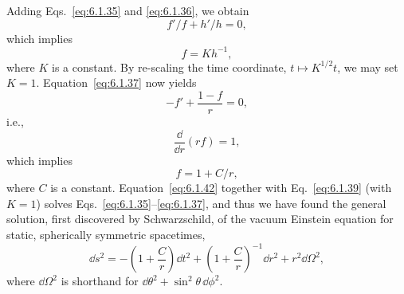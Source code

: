 Adding Eqs.~\eqref{eq:6.1.35} and \eqref{eq:6.1.36}, we obtain
\begin{equation}
  f'/f+h'/h=0,
  \tag{6.1.38}\label{eq:6.1.38}
\end{equation}
which implies
\begin{equation}
  f=Kh^{-1},
  \tag{6.1.39}\label{eq:6.1.39}
\end{equation}
where \(K\) is a constant. By re-scaling the time coordinate,
\(t\mapsto K^{1/2}t\), we may set \(K=1\). Equation~\eqref{eq:6.1.37} now yields
\begin{equation}
  -f'+\frac{1-f}{r}=0,
  \tag{6.1.40}\label{eq:6.1.40}
\end{equation}
i.e.,
\begin{equation}
  \frac{\dd}{\dd r}(rf)=1,
  \tag{6.1.41}\label{eq:6.1.41}
\end{equation}
which implies
\begin{equation}
  f=1+C/r,
  \tag{6.1.42}\label{eq:6.1.42}
\end{equation}
where \(C\) is a constant. Equation~\eqref{eq:6.1.42} together with
Eq.~\eqref{eq:6.1.39} (with \(K=1\)) solves Eqs.~\eqref{eq:6.1.35}--\eqref{eq:6.1.37},
and thus we have found the general solution, first discovered by Schwarzschild,
of the vacuum Einstein equation for static, spherically symmetric spacetimes,
\begin{equation}
  \dd s^2=-\left(1+\frac{C}{r}\right)\dd t^2+
  \left(1+\frac{C}{r}\right)^{-1}\dd r^2+r^2\dd\Omega^2,
  \tag{6.1.43}\label{eq:6.1.43}
\end{equation}
where \(\dd\Omega^2\) is shorthand for \(\dd\theta^2+\sin^2\theta\,\dd\phi^2\).

